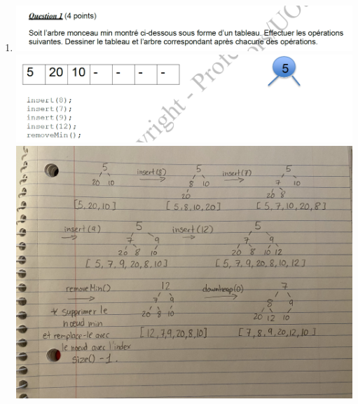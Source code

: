 \documentclass[12pt]{book}
\begin{document}
\newcommand{\reporttitle}{Laboratoire 4}
\newcommand{\reportauthorOne}{Kien Do}
\newcommand{\cidOne}{300163370}





\begin{enumerate}
    
    \item
    
    \includegraphics[scale=0.5]{q1question.PNG}\\
    \includegraphics[scale=0.5]{q1question2.PNG}\\
    \includegraphics[scale=0.13]{q1answer.png}\\
    
    \newpage
    

\end{enumerate}
\end{document}
